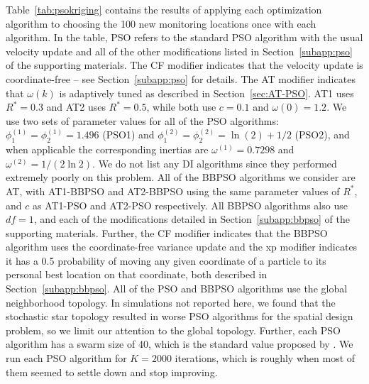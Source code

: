 \documentclass[cmbright]{staauth}
\begin{document}
Table~\ref{tab:psokriging} contains the results of applying each optimization algorithm to choosing the 100 new monitoring locations once with each algorithm. In the table, PSO refers to the standard PSO algorithm with the usual velocity update and all of the other modifications listed in Section~\ref{subapp:pso} of the supporting materials. The CF modifier indicates that the velocity update is coordinate-free -- see Section~\ref{subapp:pso} for details. The AT modifier indicates that $\omega(k)$ is adaptively tuned as described in Section~\ref{sec:AT-PSO}. AT1 uses $R^*=0.3$ and AT2 uses $R^*=0.5$, while both use $c=0.1$ and $\omega(0) = 1.2$. We use two sets of parameter values for all of the PSO algorithms: $\phi_1^{(1)}=\phi_2^{(1)}=1.496$ (PSO1) and $\phi_1^{(2)}=\phi_2^{(2)}=\ln(2) + 1/2$ (PSO2), and when applicable the corresponding inertias are $\omega^{(1)}=0.7298$ and $\omega^{(2)}=1/(2\ln 2)$. We do not list any DI algorithms since they performed extremely poorly on this problem. All of the BBPSO algorithms we consider are AT, with AT1-BBPSO and AT2-BBPSO using the same parameter values of $R^*$, and $c$ as AT1-PSO and AT2-PSO respectively. All BBPSO algorithms also use $df=1$, and each of the modifications detailed in Section~\ref{subapp:bbpso} of the supporting materials. Further, the CF modifier indicates that the BBPSO algorithm uses the coordinate-free variance update and the xp modifier indicates it has a 0.5 probability of moving any given coordinate of a particle to its personal best location on that coordinate, both described in Section~\ref{subapp:bbpso}. All of the PSO and BBPSO algorithms use the global neighborhood topology. In simulations not reported here, we found that the stochastic star topology resulted in worse PSO algorithms for the spatial design problem, so we limit our attention to the global topology. Further, each PSO algorithm has a swarm size of 40, which is the standard value proposed by \cite{clerc2011spso}. We run each PSO algorithm for $K=2000$ iterations, which is roughly when most of them seemed to settle down and stop improving.
\end{document}
